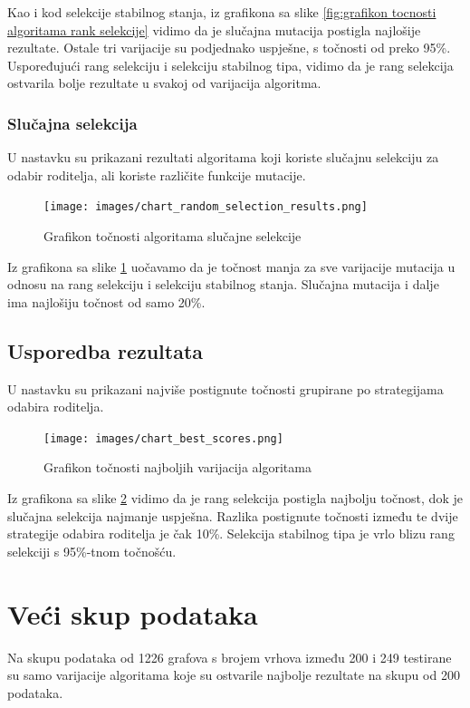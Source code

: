 \documentclass[times, utf8, zavrsni]{fer}
\begin{document}
Kao i kod selekcije stabilnog stanja, iz  grafikona sa slike \ref{fig:grafikon tocnosti algoritama rank selekcije} vidimo da je slučajna mutacija postigla najlošije rezultate. Ostale tri varijacije su podjednako uspješne, s točnosti od preko 95\%. Uspoređujući rang selekciju i selekciju stabilnog tipa, vidimo da je rang selekcija ostvarila bolje rezultate u svakoj od varijacija algoritma.

\newpage
\subsubsection{Slučajna selekcija}
U nastavku su prikazani rezultati algoritama koji koriste slučajnu selekciju za odabir roditelja, ali koriste različite funkcije mutacije.

\begin{figure}[h]
\centering
\texttt{[image: images/chart\_random\_selection\_results.png]}
\caption{Grafikon točnosti algoritama slučajne selekcije}
\label{fig:grafikon tocnosti algoritama slucajne selekcije}
\end{figure}

Iz grafikona sa slike \ref{fig:grafikon tocnosti algoritama slucajne selekcije} uočavamo da je točnost manja za sve varijacije mutacija u odnosu na rang selekciju i selekciju stabilnog stanja. Slučajna mutacija i dalje ima najlošiju točnost od samo 20\%.

\newpage
\subsection{Usporedba rezultata}
U nastavku su prikazani najviše postignute točnosti grupirane po strategijama odabira roditelja.

\begin{figure}[h]
\centering
\texttt{[image: images/chart\_best\_scores.png]}
\caption{Grafikon točnosti najboljih varijacija algoritama}
\label{fig:grafikon tocnosti najboljih varijacija algoritama}
\end{figure}

Iz grafikona sa slike \ref{fig:grafikon tocnosti najboljih varijacija algoritama} vidimo da je rang selekcija postigla najbolju točnost, dok je slučajna selekcija najmanje uspješna. Razlika postignute točnosti između te dvije strategije odabira roditelja je čak 10\%. Selekcija stabilnog tipa je vrlo blizu rang selekciji s 95\%-tnom točnošću. 

\newpage
\section{Veći skup podataka}
Na skupu podataka od 1226 grafova s brojem vrhova između 200 i 249 testirane su samo varijacije algoritama koje su ostvarile najbolje rezultate na skupu od 200 podataka.
\end{document}
